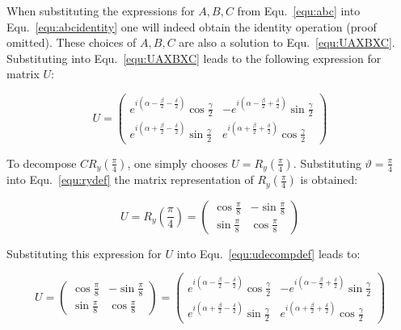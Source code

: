 When substituting the expressions for $A,B,C$ from Equ.~\ref{equ:abc} into Equ.~\ref{equ:abcidentity} one will indeed obtain the identity operation (proof omitted). These choices of $A,B,C$ are also a solution to Equ.~\ref{equ:UAXBXC}. Substituting into Equ.~\ref{equ:UAXBXC} leads to the following expression for matrix $U$:

\begin{equation}
\label{equ:udecompdef}
U = \begin{pmatrix}
 e^{i(\alpha-\frac{\beta}{2}-\frac{\delta}{2})}\cos{\frac{\gamma}{2}} & -e^{i(\alpha-\frac{\beta}{2}+\frac{\delta}{2})}\sin{\frac{\gamma}{2}} \\ 
e^{i(\alpha+\frac{\beta}{2}-\frac{\delta}{2})}\sin{\frac{\gamma}{2}} & e^{i(\alpha+\frac{\beta}{2}+\frac{\delta}{2})}\cos{\frac{\gamma}{2}}
 \end{pmatrix}
\end{equation}

To decompose $CR_y(\frac{\pi}{4})$, one simply chooses $U = R_y(\frac{\pi}{4})$. Substituting $\vartheta = \frac{\pi}{4}$ into Equ.~\ref{equ:rydef} the matrix representation of $R_y(\frac{\pi}{4})$ is obtained:

\begin{equation}
U = R_y(\frac{\pi}{4}) = \begin{pmatrix}
\cos\frac{\pi}{8} & -\sin\frac{\pi}{8} \\
\sin\frac{\pi}{8} & \cos\frac{\pi}{8}
\end{pmatrix}
\end{equation}

Substituting this expression for $U$ into Equ.~\ref{equ:udecompdef} leads to:

\begin{equation}
\label{equ:udecompsubbed}
U = \begin{pmatrix}
\cos\frac{\pi}{8} & -\sin\frac{\pi}{8} \\
\sin\frac{\pi}{8} & \cos\frac{\pi}{8}
\end{pmatrix} = \begin{pmatrix}
 e^{i(\alpha-\frac{\beta}{2}-\frac{\delta}{2})}\cos{\frac{\gamma}{2}} & -e^{i(\alpha-\frac{\beta}{2}+\frac{\delta}{2})}\sin{\frac{\gamma}{2}} \\ 
e^{i(\alpha+\frac{\beta}{2}-\frac{\delta}{2})}\sin{\frac{\gamma}{2}} & e^{i(\alpha+\frac{\beta}{2}+\frac{\delta}{2})}\cos{\frac{\gamma}{2}}
 \end{pmatrix}
\end{equation}


